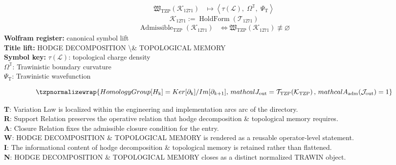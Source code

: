 \noindent
\begin{minipage}[t]{0.48\linewidth}
\begingroup
\small
\[
\begin{aligned}
\mathfrak{W}_{\mathrm{TZP}}\!\left(\mathcal{K}_{1271}\right)
&\longmapsto
\left\langle \tau(\mathcal{L}),\; \Omega^{\mathbb{T}},\; \Psi_{\mathrm{T}} \right\rangle
\end{aligned}
\]
\[
\mathcal{K}_{1271}
:=
\operatorname{HoldForm}\!\left(\mathcal{T}_{1271}\right)
\]
\[
\begin{aligned}
\operatorname{Admissible}_{\mathrm{TZP}}\!\left(\mathcal{K}_{1271}\right)
&\Longleftrightarrow
\mathfrak{W}_{\mathrm{TZP}}\!\left(\mathcal{K}_{1271}\right)\not\equiv\varnothing
\end{aligned}
\]
\textbf{Wolfram register:} canonical symbol lift\\
\textbf{Title lift:} HODGE DECOMPOSITION \textbackslash{}\& TOPOLOGICAL MEMORY\\
\textbf{Symbol key:} \(\tau(\mathcal{L})\): topological charge density\\ \(\Omega^{\mathbb{T}}\): Trawinistic boundary curvature\\ \(\Psi_{\mathrm{T}}\): Trawinistic wavefunction
\par
\endgroup
\end{minipage}\hfill
\begin{minipage}[t]{0.48\linewidth}
\[
\tzpnormalizewrap{HomologyGroup[H_{\mathrm{k}}] = Ker[\partial_{\mathrm{k}}]/Im[\partial_{k+1}],\,mathcal{J}_{\mathrm{out}} = \mathcal{T}_{\mathrm{TZP}}\!\left(\mathcal{K}_{\mathrm{TZP}}\right),\,mathcal{A}_{\mathrm{adm}}\!\left(\mathcal{J}_{\mathrm{out}}\right)=1}
\]

\small
\textbf{T}: Variation Law is localized within the engineering and implementation arcs arc of the directory.\\
\textbf{R}: Support Relation preserves the operative relation that hodge decomposition \& topological memory requires.\\
\textbf{A}: Closure Relation fixes the admissible closure condition for the entry.\\
\textbf{W}: HODGE DECOMPOSITION \& TOPOLOGICAL MEMORY is rendered as a reusable operator-level statement.\\
\textbf{I}: The informational content of hodge decomposition \& topological memory is retained rather than flattened.\\
\textbf{N}: HODGE DECOMPOSITION \& TOPOLOGICAL MEMORY closes as a distinct normalized TRAWIN object.
\normalsize
\end{minipage}

